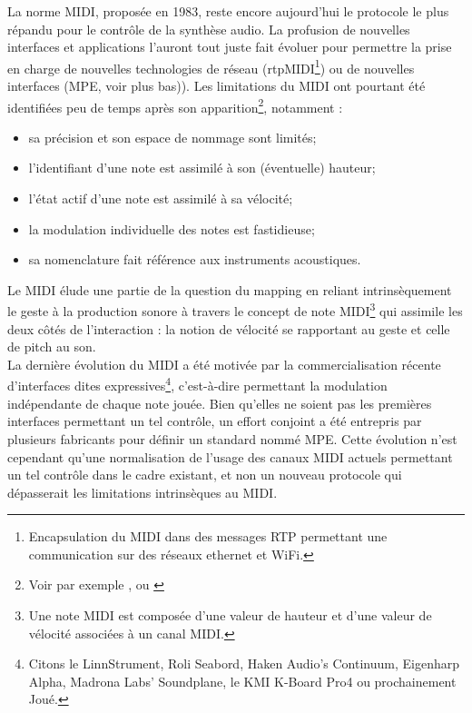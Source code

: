 \noindent La norme \gls{MIDI}, proposée en 1983, reste encore aujourd'hui le protocole le plus répandu pour le contrôle de la synthèse audio. La profusion de nouvelles interfaces et applications l'auront tout juste fait évoluer pour permettre la prise en charge de nouvelles technologies de réseau (rtpMIDI\footnote{ Encapsulation du \gls{MIDI} dans des messages \gls{RTP} permettant une communication sur des réseaux ethernet et WiFi.}) ou de nouvelles interfaces (\gls{MPE}, voir plus bas)).
Les limitations du \gls{MIDI} ont pourtant été identifiées peu de temps après son apparition\footnote{Voir par exemple \cite{moore_dysfunctions_1988}, \cite{mcmillen_zipi_1994} ou \cite{selfridge-field_beyond_1997}}, notamment :
\vspace{-1em}
\begin{itemize}[noitemsep]
	\item sa précision et son espace de nommage sont limités;
	\item l'identifiant d'une note est assimilé à son (éventuelle) hauteur;
	\item l'état actif d'une note est assimilé à sa vélocité;
	\item la modulation individuelle des notes est fastidieuse;
	\item sa nomenclature fait référence aux instruments acoustiques.
\end{itemize}

\noindent Le \gls{MIDI} élude une partie de la question du mapping en reliant intrinsèquement le geste à la production sonore à travers le concept de note \gls{MIDI}\footnote{ Une note \gls{MIDI} est composée d'une valeur de hauteur et d'une valeur de vélocité associées à un canal \gls{MIDI}.} qui assimile les deux côtés de l'interaction : la notion de vélocité se rapportant au geste et celle de pitch au son.\\
\indent La dernière évolution du \gls{MIDI} a été motivée par la commercialisation récente d'interfaces dites expressives\footnote{ Citons le LinnStrument, Roli Seabord, Haken Audio’s Continuum, Eigenharp Alpha, Madrona Labs’ Soundplane, le KMI K-Board Pro4 ou prochainement Joué.}, c'est-à-dire permettant la modulation indépendante de chaque note jouée. Bien qu'elles ne soient pas les premières interfaces permettant un tel contrôle, un effort conjoint a été entrepris par plusieurs fabricants pour définir un standard nommé \gls{MPE}. Cette évolution n'est cependant qu'une normalisation de l'usage des canaux \gls{MIDI} actuels permettant un tel contrôle dans le cadre existant, et non un nouveau protocole qui dépasserait les limitations intrinsèques au \gls{MIDI}.

